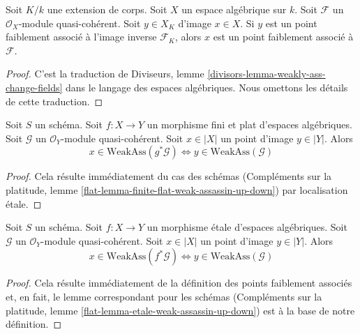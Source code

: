 \begin{lemma}
\label{lemma-weakly-ass-change-fields}
Soit $K/k$ une extension de corps. Soit $X$ un espace algébrique sur $k$.
Soit $\mathcal{F}$ un $\mathcal{O}_X$-module quasi-cohérent.
Soit $y \in X_K$ d'image $x \in X$. Si $y$ est un point
faiblement associé à l'image inverse $\mathcal{F}_K$, alors $x$
est un point faiblement associé à $\mathcal{F}$.
\end{lemma}

\begin{proof}
C'est la traduction de
Diviseurs, lemme \ref{divisors-lemma-weakly-ass-change-fields}
dans le langage des espaces algébriques. Nous omettons les détails de cette
traduction.
\end{proof}

\begin{lemma}
\label{lemma-finite-flat-weak-assassin-up-down}
Soit $S$ un schéma.
Soit $f : X \to Y$ un morphisme fini et plat d'espaces algébriques.
Soit $\mathcal{G}$ un $\mathcal{O}_Y$-module quasi-cohérent.
Soit $x \in |X|$ un point d'image $y \in |Y|$. Alors
$$
x \in \text{WeakAss}(g^*\mathcal{G})
\Leftrightarrow
y \in \text{WeakAss}(\mathcal{G})
$$
\end{lemma}

\begin{proof}
Cela résulte immédiatement du cas des schémas
(Compléments sur la platitude, lemme \ref{flat-lemma-finite-flat-weak-assassin-up-down})
par localisation \'etale.
\end{proof}

\begin{lemma}
\label{lemma-etale-weak-assassin-up-down}
Soit $S$ un schéma.
Soit $f : X \to Y$ un morphisme \'etale d'espaces algébriques.
Soit $\mathcal{G}$ un $\mathcal{O}_Y$-module quasi-cohérent.
Soit $x \in |X|$ un point d'image $y \in |Y|$. Alors
$$
x \in \text{WeakAss}(f^*\mathcal{G})
\Leftrightarrow
y \in \text{WeakAss}(\mathcal{G})
$$
\end{lemma}

\begin{proof}
Cela résulte immédiatement de la définition des points faiblement associés
et, en fait, le lemme correspondant pour les schémas
(Compléments sur la platitude, lemme \ref{flat-lemma-etale-weak-assassin-up-down})
est à la base de notre définition.
\end{proof}







